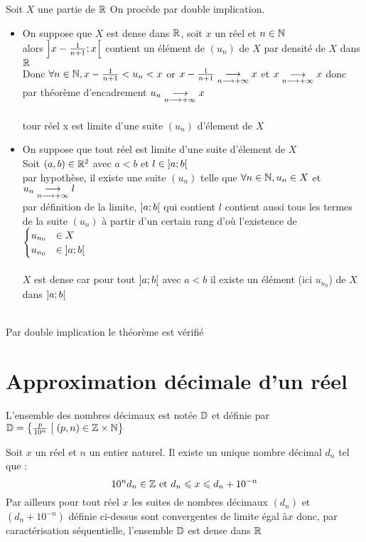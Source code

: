 \begin{dem}
    Soit \(X\) une partie de \(\mathbb{R}\)
    On procède par double implication.
    \begin{itemize}
    \item[\impdir]
    On suppose que \(X\) est dense dans \(\mathbb{R}\), soit \(x\) un réel et \(n\in\mathbb{N}\) \\
    alors \(\left]x-\frac{1}{n+1};x\right[\) contient un élément de \((u_n)\) de \(X\) par densité de \(X\) dans \(\mathbb{R}\) \\
    Donc \(\forall n \in \mathbb{N},x-\frac{1}{n+1}<u_n<x\) or \(x-\frac{1}{n+1} \underset{n\longrightarrow+\infty}{\longrightarrow}x\) et \(x\underset{n\longrightarrow+\infty}{\longrightarrow}x\) donc par théorème d'encadrement \(u_n \underset{n\longrightarrow+\infty}{\longrightarrow}x\) \\
    \conclusion \\
    tour réel x est limite d'une suite \((u_n)\) d'élement de \(X\)
    \item[\imprec] On suppose que tout réel est limite d'une suite d'élement de \(X\) \\
    Soit \((a,b)\in\mathbb{R}^2\) avec \(a<b\) et \(l\in \left]a;b\right[\)\\
    par hypothèse, il existe une suite \((u_n)\) telle que \(\forall n \in \mathbb{N}, u_n \in X\) et \(u_n\underset{n\longrightarrow+\infty}{\longrightarrow}l\)\\
    par définition de la limite, \(\left]a;b\right[\) qui contient \(l\) contient aussi tous les termes de la suite \((u_n)\) à partir d'un certain rang d'où l'existence de 
    \(\begin{cases}
        u_{n_0} &\in X \\
        u_{n_0} &\in \left]a;b\right[
    \end{cases}\)\\
    \conclusion \\
    \(X\) est dense car pour tout \(\left]a;b\right[\) avec \(a<b\) il existe un élément (ici \(u_{n_0}\)) de \(X\) dans \(\left]a;b\right[\)
    \end{itemize} 
    \conclusion \\
    Par double implication le théorème est vérifié
\end{dem}

\section{Approximation décimale d'un réel}
\begin{defprop}[rappel]
    L'ensemble des nombres décimaux est notée \(\mathbb{D}\) et définie par \(\mathbb{D} = \left\lbrace\frac{p}{10^n}\;\middle|\; (p,n)\in\mathbb{Z}\times\mathbb{N}\right\rbrace\)
\end{defprop}
\begin{prop}
    Soit \(x\) un réel et \(n\) un entier naturel. Il existe un unique nombre décimal \(d_n\) tel que :
    \[10^nd_n \in\mathbb{Z} \text{ et } d_n \leqslant x \leqslant d_n+10^{-n}\]
    Par ailleurs pour tout réel \(x\) les suites de nombres décimaux \((d_n)\) et \((d_n+10^{-n})\) définie ci-dessus sont convergentes de limite égal à\(x\) donc, par caractérisation séquentielle, l'ensemble \(\mathbb{D}\) est dense dans \(\mathbb{R}\)
\end{prop}

